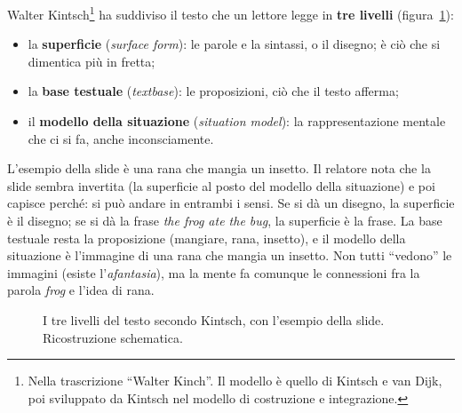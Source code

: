 Walter Kintsch\footnote{Nella trascrizione ``Walter Kinch''. Il modello è
quello di Kintsch e van Dijk, poi sviluppato da Kintsch nel modello di
costruzione e integrazione.} ha suddiviso il testo che un lettore legge in
\textbf{tre livelli} (figura~\ref{pt:fig:kintsch}):
\begin{itemize}
  \item la \textbf{superficie} (\emph{surface form}): le parole e la sintassi,
        o il disegno; è ciò che si dimentica più in fretta;
  \item la \textbf{base testuale} (\emph{textbase}): le proposizioni, ciò che
        il testo afferma;
  \item il \textbf{modello della situazione} (\emph{situation model}): la
        rappresentazione mentale che ci si fa, anche inconsciamente.
\end{itemize}
L'esempio della slide è una rana che mangia un insetto. Il relatore nota che la
slide sembra invertita (la superficie al posto del modello della situazione) e
poi capisce perché: si può andare in entrambi i sensi. Se si dà un disegno, la
superficie è il disegno; se si dà la frase \emph{the frog ate the bug}, la
superficie è la frase. La base testuale resta la proposizione (mangiare, rana,
insetto), e il modello della situazione è l'immagine di una rana che mangia un
insetto. Non tutti ``vedono'' le immagini (esiste l'\emph{afantasia}), ma la
mente fa comunque le connessioni fra la parola \emph{frog} e l'idea di rana.

\begin{figure}[htbp]
\centering
{}
\caption{I tre livelli del testo secondo Kintsch, con l'esempio della slide.
Ricostruzione schematica.}
\label{pt:fig:kintsch}
\end{figure}

